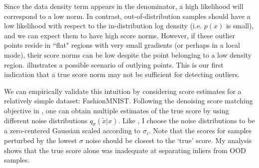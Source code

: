 Since the data density term appears in the denominator, a high likelihood will correspond to a low norm. In contrast, out-of-distribution samples should have a low likelihood with respect to the in-distribution log density (i.e. $p(x)$ is small), and we can expect them to have high score norms. However, if these outlier points reside in ``flat" regions with very small gradients (or perhaps in a local mode),  their score norms can be low despite the point belonging to a low density region. 
 illustrates a possible scenario of outlying points.
This is our first indication that a true score norm may not be sufficient for detecting outliers. 

We can empirically validate this intuition by considering score estimates for a relatively simple dataset: FashionMNIST. Following the denoising score matching objective in , one can obtain multiple estimates of the true score by using different noise distributions $q_{\sigma}(\tilde{x}|x)$. Like \cite{Song2019}, I choose the noise distributions to be a zero-centered Gaussian scaled according to $\sigma_i$. Note that the scores for samples perturbed by the lowest $\sigma$ noise should be closest to the `true' score. My analysis shows that the true score alone was inadequate at separating inliers from OOD samples.

